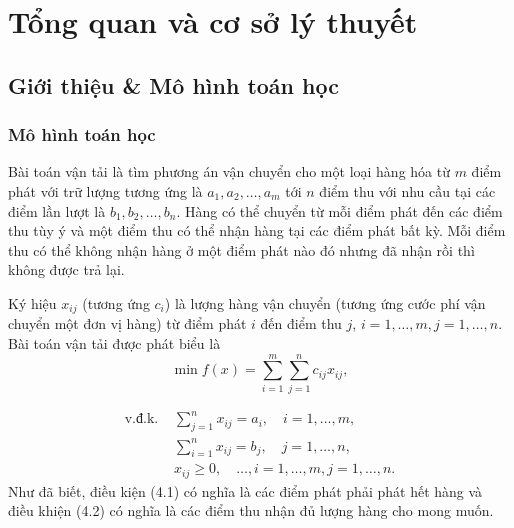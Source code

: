 \chapter{Tổng quan và cơ sở lý thuyết}
    \section{Giới thiệu \& Mô hình toán học}

        \subsection{Mô hình toán học}
            Bài toán vận tải là tìm phương án vận chuyển cho một loại hàng hóa từ $m$ điểm phát với trữ lượng tương ứng là $a_1, a_2, \dots , a_m$ tới $n$ điểm thu với nhu cầu tại các điểm lần lượt là $b_1, b_2, \dots, b_n$. Hàng có thể chuyển từ mỗi điểm phát đến các điểm thu tùy ý và một điểm thu có thể nhận hàng tại các điểm phát bất kỳ. Mỗi điểm thu có thể không nhận hàng ở một điểm phát nào đó nhưng đã nhận rồi thì không được trả lại.

            Ký hiệu $x_{ij}$ (tương ứng $c_{i}$) là lượng hàng vận chuyển (tương ứng cước phí vận chuyển một đơn vị hàng) từ điểm phát $i$ đến điểm thu $j$, $i = 1, \dots, m, j=1, \dots, n$. Bài toán vận tải được phát biểu là
            $$
            \min f(x) = \sum_{i=1}^m \sum_{j=1}^n c_{ij} x_{ij},
            $$

            $$
            \begin{aligned}
                \text{v.đ.k. }  &\sum_{j=1}^n x_{ij} = a_i, \quad i= 1, \dots,          m,\\
                                &\sum_{i=1}^n x_{ij} = b_j, \quad j= 1, \dots, n,\\    
                                &x_{ij} \geq 0, \quad \dots, i= 1, \dots, m,  j= 1, \dots, n.       
            \end{aligned}
            $$
            Như đã biết, điều kiện (4.1) có nghĩa là các điểm phát phải phát hết hàng và điều khiện (4.2) có nghĩa là các điểm thu nhận đủ lượng hàng cho mong muốn.

